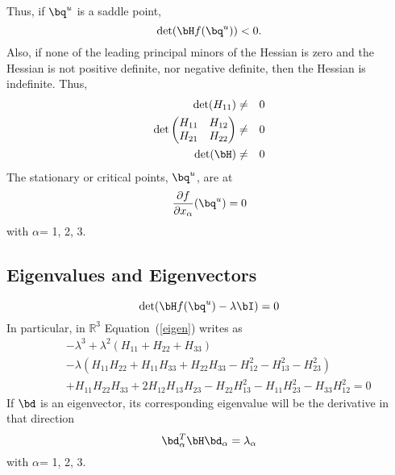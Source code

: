 \documentclass[10pt,a4paper]{article}
\begin{document}
Thus, if $\bq^u$ is a saddle point,
\begin{equation}
\det(\bH f(\bq^u))<0.
\end{equation}
Also, if none of the leading principal minors of the Hessian is zero and the Hessian is not positive definite, nor negative definite, then the Hessian is indefinite. Thus,
\begin{eqnarray}
  \det(H_{11}) &\neq& 0 \\
  \det\begin{pmatrix}
         H_{11} & H_{12} \\
         H_{21} & H_{22} \\
       \end{pmatrix}
  &\neq& 0 \\
  \det(\bH) &\neq& 0
\end{eqnarray}
The stationary or critical points, $\bq^u$, are at
\begin{equation}
\frac{\partial f}{\partial x _{\alpha}} (\bq^u) = 0
\end{equation}
with $\alpha$= 1, 2, 3.

\subsection{Eigenvalues and Eigenvectors}
\begin{equation}\label{eigen}
\det( \bH f(\bq^u) -\lambda \bI)=0
\end{equation}
In particular, in $ \mathbb{R}^3$ Equation~(\ref{eigen}) writes as
\begin{eqnarray}
&&-\lambda^3+\lambda^2(H_{11}+H_{22}+H_{33})\nonumber\\
&&-\lambda(H_{11}H_{22}+H_{11}H_{33}+H_{22}H_{33}-H_{12}^2-H_{13}^2-H_{23}^2)\nonumber\\
&&+H_{11}H_{22}H_{33}+2H_{12}H_{13}H_{23}-H_{22}H_{13}^2-H_{11}H_{23}^2-H_{33}H_{12}^2=0
\end{eqnarray}
If $\bd$ is an eigenvector, its corresponding eigenvalue will be the derivative in that direction
\begin{equation}
\bd_{\alpha}^T \bH \bd_{\alpha}= \lambda_{\alpha}
\end{equation}
with $\alpha$= 1, 2, 3.
\end{document}
